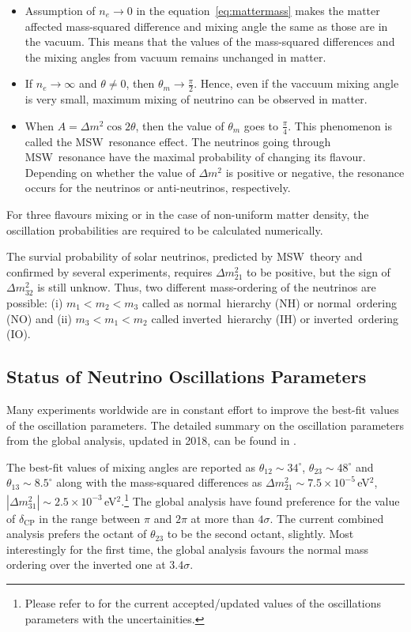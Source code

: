 \begin{itemize}\itemsep -4pt
\item Assumption of $n_{e}\rightarrow 0$ in the equation~\ref{eq:mattermass}
  makes the matter affected mass-squared difference and mixing angle the same
  as those are in the vacuum. This means that the values of the mass-squared
  differences and the mixing angles from vacuum remains unchanged in matter.
\item If $n_{e}\rightarrow\infty$ and $\theta\neq 0$, then
  $\theta_{m}\rightarrow\frac{\pi}{2}$. Hence, even if the vaccuum mixing angle
  is very small, maximum mixing of neutrino can be observed in matter.
\item When $A = \Delta m^{2}\cos 2\theta$, then the value of $\theta_{m}$ goes
  to $\frac{\pi}{4}$. This phenomenon is called the MSW~resonance effect.
  The neutrinos going through MSW~resonance have the maximal probability of
  changing its flavour. Depending on whether the value of $\Delta m^{2}$ is
  positive or negative, the resonance occurs for the neutrinos or
  anti-neutrinos, respectively.
\end{itemize}
For three flavours mixing or in the case of non-uniform matter density, the oscillation probabilities are required to be calculated numerically.

The survial probability of solar neutrinos, predicted by MSW~theory and confirmed by several experiments\cite{homestake,gallex,sage,superk,sno,kamland}, requires $\Delta m_{21}^{2}$ to be positive, but the sign of $\Delta m_{32}^{2}$ is still unknow. Thus, two different mass-ordering of the neutrinos are possible: (i) $m_{1}<m_{2}<m_{3}$ called as normal~hierarchy (NH) or normal~ordering (NO) and (ii) $m_{3}<m_{1}<m_{2}$ called inverted~hierarchy (IH) or inverted~ordering (IO).


\subsection{Status of Neutrino Oscillations Parameters}
Many experiments worldwide are in constant effort to improve the
best-fit values of the oscillation parameters. The detailed summary
on the oscillation parameters from the global analysis, updated in
2018, can be found in \cite{neutrinostatus}.

The best-fit values of mixing angles are reported as
$\theta_{12}\sim 34^{\circ}$, $\theta_{23}\sim 48^{\circ}$ and
$\theta_{13}\sim 8.5^{\circ}$ along with the mass-squared differences as
$\Delta m^2_{21}\sim 7.5\times 10^{-5}$\,eV$^{2}$,
$\left|\Delta m^2_{31}\right|\sim 2.5\times 10^{-3}$\,eV$^{2}$.\footnote{Please refer to \cite{neutrinostatus} for the current accepted/updated values of the oscillations parameters with the uncertainities.}
The global analysis have found preference for the value of
$\delta_{\mathrm{CP}}$ in the range between $\pi$ and $2\pi$ at more than
$4\sigma$\cite{neutrinostatus}. The current combined analysis prefers
the octant of $\theta_{23}$ to be the second octant, slightly. Most
interestingly for the first time, the global analysis favours the
normal mass ordering over the inverted one at
$3.4\sigma$\cite{neutrinostatus}.

